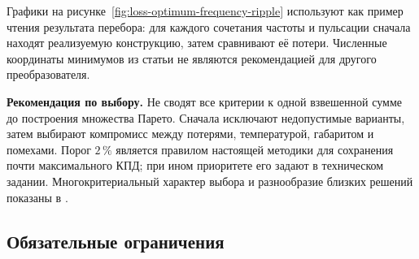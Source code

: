 \documentclass[14pt,a4paper]{extarticle}
\newcommand{\recommend}{\par\noindent\textbf{Рекомендация по выбору.} }
\begin{document}
Графики на рисунке~\ref{fig:loss-optimum-frequency-ripple} используют как
пример чтения результата перебора: для каждого сочетания частоты и
пульсации сначала находят реализуемую конструкцию, затем сравнивают её
потери. Численные координаты минимумов из статьи не являются рекомендацией
для другого преобразователя.

\recommend Не сводят все критерии к одной взвешенной сумме до
построения множества Парето. Сначала исключают недопустимые варианты,
затем выбирают компромисс между потерями, температурой, габаритом и
помехами. Порог $2\,\%$ является правилом настоящей методики для сохранения
почти максимального КПД; при ином приоритете его задают в техническом
задании. Многокритериальный характер выбора и разнообразие близких решений
показаны в \cite{papamanolis,pichon}.

\subsection{Обязательные ограничения}
\label{subsec:mandatory-constraints}
\end{document}
